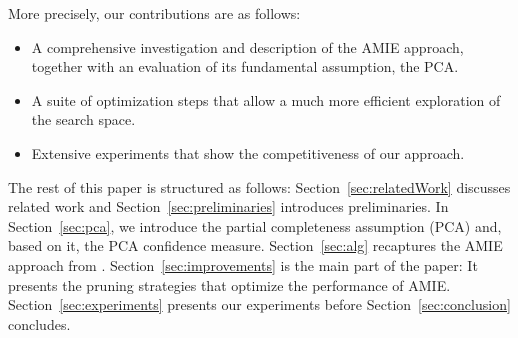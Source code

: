 \noindent More precisely, our contributions are as follows:
\begin{itemize}[noitemsep,nolistsep,leftmargin=0.4cm,midpenalty=0,label=$\bullet$]
\item A comprehensive investigation and description of the AMIE approach, together with an evaluation of its fundamental assumption, the PCA. %
\item A suite of optimization steps that allow a much more efficient exploration of the search space.
\item Extensive experiments that show the competitiveness of our approach.
\end{itemize}
The rest of this paper is structured as follows: Section~\ref{sec:relatedWork} discusses related work and Section~\ref{sec:preliminaries} introduces preliminaries.
In Section~\ref{sec:pca}, we introduce the partial completeness assumption (PCA) and, based on it, the PCA confidence measure.
Section~\ref{sec:alg} recaptures the AMIE approach from \cite{amie}.
Section~\ref{sec:improvements} is the main part of the paper: It presents the pruning strategies that optimize the performance of AMIE.
Section~\ref{sec:experiments} presents our experiments before Section~\ref{sec:conclusion} concludes.





